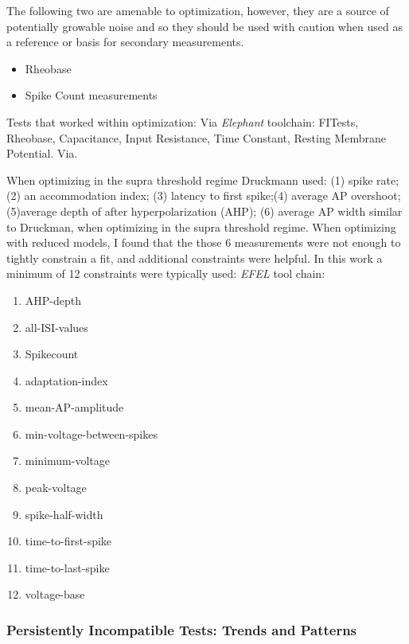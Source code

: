 The following two are amenable to optimization, however, they are a source of potentially growable noise and so they should be used with caution when used as a reference or basis for secondary measurements.
\begin{itemize}
\item Rheobase 
\item Spike Count measurements \end{itemize}



Tests that worked within optimization:
Via \emph{Elephant} toolchain: FITests, Rheobase, Capacitance, Input Resistance, Time Constant, Resting Membrane Potential.
Via. 

When optimizing in the supra threshold regime Druckmann used:
(1) spike rate; (2) an accommodation index; (3) latency to first spike;(4) average AP overshoot; (5)average depth of after hyperpolarization (AHP); 
(6) average AP width similar to Druckman, when optimizing in the supra threshold regime.
When optimizing with reduced models, I found that the those 6 measurements were not enough to tightly constrain a fit, and additional constraints were helpful. In this work a minimum of 12 constraints were typically used:
\emph{EFEL}
tool chain:
\begin{enumerate}
\item AHP-depth
\item all-ISI-values
\item Spikecount %
\item adaptation-index
\item mean-AP-amplitude
\item min-voltage-between-spikes
\item minimum-voltage
\item peak-voltage
\item spike-half-width
\item time-to-first-spike
\item time-to-last-spike
\item voltage-base
\end{enumerate}

\subsubsection{Persistently Incompatible Tests: Trends and Patterns}

